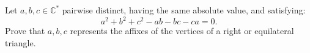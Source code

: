 Let $ a,b,c\in\mathbb{C}^* $ pairwise distinct, having the same absolute value, and satisfying:
$$ a^2+b^2+c^2-ab-bc-ca=0. $$Prove that $ a,b,c $ represents the affixes of the vertices of a right or equilateral triangle.
